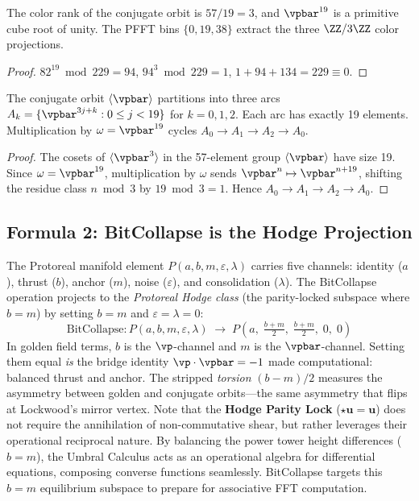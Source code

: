 \begin{theorem}\label{thm:color_proj}
The color rank of the conjugate orbit is $57 / 19 = 3$, and $\vpbar^{19}$ is a primitive cube root of unity. The PFFT bins $\{0, 19, 38\}$ extract the three $\ZZ/3\ZZ$ color projections.
\end{theorem}

\begin{proof}
$82^{19} \bmod 229 = 94$, $94^3 \bmod 229 = 1$, $1 + 94 + 134 = 229 \equiv 0$. \qedhere
\end{proof}

\begin{proposition}\label{prop:arcs}
The conjugate orbit $\langle \vpbar \rangle$ partitions into three arcs $A_k = \{\vpbar^{3j+k} : 0 \leq j < 19\}$ for $k = 0, 1, 2$. Each arc has exactly 19 elements. Multiplication by $\omega = \vpbar^{19}$ cycles $A_0 \to A_1 \to A_2 \to A_0$.
\end{proposition}

\begin{proof}
The cosets of $\langle \vpbar^3 \rangle$ in the 57-element group $\langle \vpbar \rangle$ have size 19. Since $\omega = \vpbar^{19}$, multiplication by $\omega$ sends $\vpbar^n \mapsto \vpbar^{n+19}$, shifting the residue class $n \bmod 3$ by $19 \bmod 3 = 1$. Hence $A_0 \to A_1 \to A_2 \to A_0$. \qedhere
\end{proof}

\subsection{Formula 2: BitCollapse is the Hodge Projection}

The Protoreal manifold element $P(a, b, m, \varepsilon, \lambda)$ carries five channels: identity ($a$), thrust ($b$), anchor ($m$), noise ($\varepsilon$), and consolidation ($\lambda$). The BitCollapse operation projects to the \emph{Protoreal Hodge class} (the parity-locked subspace where $b = m$) by setting $b = m$ and $\varepsilon = \lambda = 0$:
\[
\mathrm{BitCollapse}: P(a, b, m, \varepsilon, \lambda) \;\longrightarrow\; P\!\left(a,\; \tfrac{b+m}{2},\; \tfrac{b+m}{2},\; 0,\; 0\right)
\]
In golden field terms, $b$ is the $\vp$-channel and $m$ is the $\vpbar$-channel. Setting them equal \emph{is} the bridge identity $\vp \cdot \vpbar = -1$ made computational: balanced thrust and anchor. The stripped \emph{torsion} $(b - m)/2$ measures the asymmetry between golden and conjugate orbits---the same asymmetry that flips at Lockwood's mirror vertex. Note that the \textbf{Hodge Parity Lock} ($\star \mathbf{u} = \mathbf{u}$) does not require the annihilation of non-commutative shear, but rather leverages their operational reciprocal nature. By balancing the power tower height differences ($b = m$), the Umbral Calculus acts as an operational algebra for differential equations, composing converse functions seamlessly. BitCollapse targets this $b=m$ equilibrium subspace to prepare for associative FFT computation.

